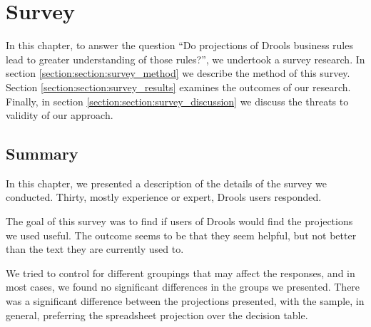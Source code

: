 \chapter{Survey}
\label{chapter:Survey}

In this chapter, to answer the question ``Do projections of Drools business rules lead to greater understanding of those rules?'', we undertook a survey research.
In section \ref{section:section:survey_method} we describe the method of this survey.
Section \ref{section:section:survey_results} examines the outcomes of our research.
Finally, in section \ref{section:section:survey_discussion} we discuss the threats to validity of our approach.





\section{Summary}
In this chapter, we presented a description of the details of the survey we conducted.
Thirty, mostly experience or expert, Drools users responded. 

The goal of this survey was to find if users of Drools would find the projections we used useful.
The outcome seems to be that they seem helpful, but not better than the text they are currently used to.

We tried to control for different groupings that may affect the responses, and in most cases, we found no significant differences in the groups we presented.
There was a significant difference between the projections presented, with the sample, in general, preferring the spreadsheet projection over the decision table. 
